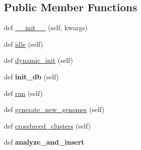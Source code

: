 \subsection*{Public Member Functions}
\begin{DoxyCompactItemize}
\item 
def \hyperlink{class_n_e_a_t___py_genetics_1_1_n_e_a_t_1_1_director_1_1_main_director_1_1_main_director_ab14b0501fc1b74c88b2e57f2c427f556}{\+\_\+\+\_\+init\+\_\+\+\_\+} (self, kwargs)
\item 
def \hyperlink{class_n_e_a_t___py_genetics_1_1_n_e_a_t_1_1_director_1_1_main_director_1_1_main_director_ae092b13a0703771ac0813e67fb872362}{idle} (self)
\item 
def \hyperlink{class_n_e_a_t___py_genetics_1_1_n_e_a_t_1_1_director_1_1_main_director_1_1_main_director_a145a35253c447b14b3a834cd6bbd6b15}{dynamic\+\_\+init} (self)
\item 
def {\bfseries init\+\_\+db} (self)\hypertarget{class_n_e_a_t___py_genetics_1_1_n_e_a_t_1_1_director_1_1_main_director_1_1_main_director_a1d54dab714e07b9ba097b118994bc7e0}{}\label{class_n_e_a_t___py_genetics_1_1_n_e_a_t_1_1_director_1_1_main_director_1_1_main_director_a1d54dab714e07b9ba097b118994bc7e0}

\item 
def \hyperlink{class_n_e_a_t___py_genetics_1_1_n_e_a_t_1_1_director_1_1_main_director_1_1_main_director_a0dc96b0a3075b0522e9179e154e3bfdc}{run} (self)
\item 
def \hyperlink{class_n_e_a_t___py_genetics_1_1_n_e_a_t_1_1_director_1_1_main_director_1_1_main_director_a62d21475b9a55ebf26b731e1af031998}{generate\+\_\+new\+\_\+genomes} (self)
\item 
def \hyperlink{class_n_e_a_t___py_genetics_1_1_n_e_a_t_1_1_director_1_1_main_director_1_1_main_director_a24b32672d44473d0ed697d72326a3ed0}{crossbreed\+\_\+clusters} (self)
\item 
def {\bfseries analyze\+\_\+and\+\_\+insert}\hypertarget{class_n_e_a_t___py_genetics_1_1_n_e_a_t_1_1_director_1_1_main_director_1_1_main_director_af9ec8145b3a3dc21f823d38b3ea08df1}{}\label{class_n_e_a_t___py_genetics_1_1_n_e_a_t_1_1_director_1_1_main_director_1_1_main_director_af9ec8145b3a3dc21f823d38b3ea08df1}


\end{DoxyCompactItemize}
